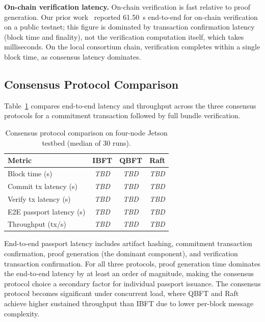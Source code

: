 \textbf{On-chain verification latency.}
On-chain verification is fast relative to proof generation.
Our prior work~\cite{jagannath2025zksnark} reported 61.50~s end-to-end for on-chain verification on a public testnet; this figure is dominated by transaction confirmation latency (block time and finality), not the verification computation itself, which takes milliseconds.
On the local consortium chain, verification completes within a single block time, as consensus latency dominates.

\subsection{Consensus Protocol Comparison}
\label{sec:eval-consensus}

Table~\ref{tab:consensus} compares end-to-end latency and throughput across the three consensus protocols for a commitment transaction followed by full bundle verification.

\begin{table}[t]
\centering
\caption{Consensus protocol comparison on four-node Jetson testbed (median of 30 runs).}
\label{tab:consensus}
\begin{tabular}{lccc}
\toprule
\textbf{Metric} & \textbf{IBFT} & \textbf{QBFT} & \textbf{Raft} \\
\midrule
Block time (s) & \textit{TBD} & \textit{TBD} & \textit{TBD} \\
Commit tx latency (s) & \textit{TBD} & \textit{TBD} & \textit{TBD} \\
Verify tx latency (s) & \textit{TBD} & \textit{TBD} & \textit{TBD} \\
E2E passport latency (s) & \textit{TBD} & \textit{TBD} & \textit{TBD} \\
Throughput (tx/s) & \textit{TBD} & \textit{TBD} & \textit{TBD} \\
\bottomrule
\end{tabular}
\end{table}

End-to-end passport latency includes artifact hashing, commitment transaction confirmation, proof generation (the dominant component), and verification transaction confirmation.
For all three protocols, proof generation time dominates the end-to-end latency by at least an order of magnitude, making the consensus protocol choice a secondary factor for individual passport issuance.
The consensus protocol becomes significant under concurrent load, where QBFT and Raft achieve higher sustained throughput than IBFT due to lower per-block message complexity.

